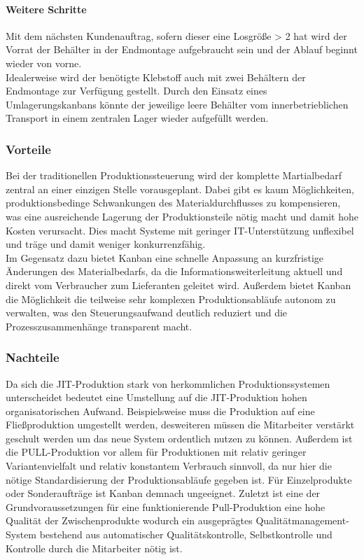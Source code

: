 \documentclass[00_ToyotaProduktionssystem.tex]{subfiles}
\begin{document}
\paragraph{Weitere Schritte}
Mit dem nächsten Kundenauftrag, sofern dieser eine Losgröße > 2 hat wird der Vorrat der Behälter in der Endmontage aufgebraucht sein und der Ablauf beginnt wieder von vorne.\\
Idealerweise wird der benötigte Klebstoff auch mit zwei Behältern der Endmontage zur Verfügung gestellt. Durch den Einsatz eines Umlagerungskanbans könnte der jeweilige leere Behälter vom innerbetrieblichen Transport in einem zentralen Lager wieder aufgefüllt werden.

\subsubsection{Vorteile}
Bei der traditionellen Produktionssteuerung wird der komplette Martialbedarf zentral an einer einzigen Stelle vorausgeplant. Dabei gibt es kaum Möglichkeiten, produktionsbedinge Schwankungen des Materialdurchflusses zu kompensieren, was eine ausreichende Lagerung der Produktionsteile nötig macht und damit hohe Kosten verursacht. Dies macht Systeme mit geringer IT-Unterstützung unflexibel und träge und damit weniger konkurrenzfähig.\\
Im Gegensatz dazu bietet Kanban eine schnelle Anpassung an kurzfristige Änderungen des Materialbedarfs, da die Informationsweiterleitung aktuell und direkt vom Verbraucher zum Lieferanten geleitet wird. Außerdem bietet Kanban die Möglichkeit die teilweise sehr komplexen Produktionsabläufe autonom zu verwalten, was den Steuerungsaufwand deutlich reduziert und die Prozesszusammenhänge transparent macht.
\subsubsection{Nachteile}
Da sich die JIT-Produktion stark von herkommlichen Produktionssystemen unterscheidet bedeutet eine Umstellung auf die JIT-Produktion hohen organisatorischen Aufwand. Beispielsweise muss die Produktion auf eine Fließproduktion umgestellt werden, desweiteren müssen die Mitarbeiter verstärkt geschult werden um das neue System ordentlich nutzen zu können. Außerdem ist die PULL-Produktion vor allem für Produktionen mit relativ geringer Variantenvielfalt und relativ konstantem Verbrauch sinnvoll, da nur hier die nötige Standardisierung der Produktionsabläufe gegeben ist. Für Einzelprodukte oder Sonderaufträge ist Kanban demnach ungeeignet. Zuletzt ist eine der Grundvoraussetzungen für eine funktionierende Pull-Produktion eine hohe Qualität der Zwischenprodukte wodurch ein ausgeprägtes Qualitätmanagement-System bestehend aus automatischer Qualitätskontrolle, Selbstkontrolle und Kontrolle durch die Mitarbeiter nötig ist.
\end{document}
